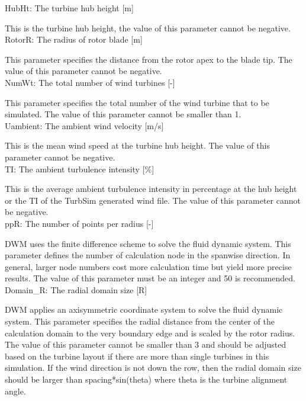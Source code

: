 \documentclass{umthesis}
\begin{document}
\noindent HubHt: The turbine hub height [m]

This is the turbine hub height, the value of this parameter cannot be negative.\\

\noindent RotorR: The radius of rotor blade [m]

This parameter specifies the distance from the rotor apex to the blade tip. The value of this parameter cannot be negative.\\

\noindent NumWt: The total number of wind turbines [-]

This parameter specifies the total number of the wind turbine that to be simulated. The value of this parameter cannot be smaller than 1.\\

\noindent Uambient: The ambient wind velocity [m/s]

This is the mean wind speed at the turbine hub height. The value of this parameter cannot be negative.\\

\noindent TI: The ambient turbulence intensity [\%]

This is the average ambient turbulence intensity in percentage at the hub height or the TI of the TurbSim generated wind file. The value of this parameter cannot be negative.\\

\noindent ppR: The number of points per radius [-]

DWM uses the finite difference scheme to solve the fluid dynamic system. This parameter defines the number of calculation node in the spanwise direction. In general, larger node numbers cost more calculation time but yield more precise results. The value of this parameter must be an integer and 50 is recommended.\\

\noindent Domain\_R: The radial domain size [R]

DWM applies an axisymmetric coordinate system to solve the fluid dynamic system. This parameter specifies the radial distance from the center of the calculation domain to the very boundary edge and is scaled by the rotor radius. The value of this parameter cannot be smaller than 3 and should be adjusted based on the turbine layout if there are more than single turbines in this simulation. If the wind direction is not down the row, then the radial domain size should be larger than spacing*sin(theta) where theta is the turbine alignment angle.\\
\end{document}
